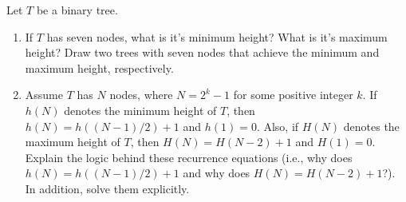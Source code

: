 Let $T$ be a binary tree.  

\begin{enumerate}

\item  If $T$ has seven nodes, what is it's minimum height?  What is 
      it's maximum height? Draw two trees with seven nodes that achieve
      the minimum and maximum height, respectively.

\item  Assume $T$ has $N$ nodes, where $N=2^{k}-1$ for some positive
      integer $k$.  If $h(N)$ denotes the minimum height of $T$, then
      $h(N)=h((N-1)/2)+1$ and $h(1)=0$. Also, if $H(N)$ denotes the
      maximum height of $T$, then $H(N)=H(N-2)+1$ and $H(1)=0$.
      Explain the logic behind these recurrence equations (i.e., why
      does $h(N)=h((N-1)/2)+1$ and why does $H(N)=H(N-2)+1$?).  In
      addition, solve them explicitly.

\end{enumerate}


















